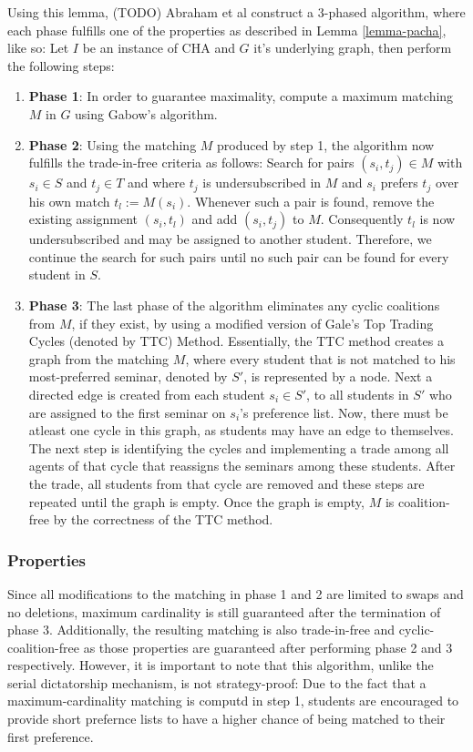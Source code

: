 Using this lemma, (TODO) Abraham et al \cite{Abraham:Pacha} construct a 3-phased algorithm, where each phase fulfills one of the properties as described in Lemma \ref{lemma-pacha}, like so: Let $I$ be an instance of CHA and $G$ it's underlying graph, then perform the following steps:
\begin{enumerate}
    \item \textbf{Phase 1}: In order to guarantee maximality, compute a maximum matching $M$ in $G$ using Gabow's algorithm. \cite{Gabow1983}
    \item \textbf{Phase 2}: Using the matching $M$ produced by step 1, the algorithm now fulfills the trade-in-free criteria as follows: Search for pairs $(s_i, t_j) \in M$ with $s_i \in S$ and $t_j \in T$ and where $t_j$ is undersubscribed in $M$ and $s_i$ prefers $t_j$ over his own match $t_l := M(s_i)$. Whenever such a pair is found, remove the existing assignment $(s_i, t_l)$ and add $(s_i, t_j)$ to $M$. Consequently $t_l$ is now undersubscribed and may be assigned to another student. Therefore, we continue the search for such pairs until no such pair can be found for every student in $S$.
    \item \textbf{Phase 3}: The last phase of the algorithm eliminates any cyclic coalitions from $M$, if they exist, by using a modified version of Gale's Top Trading Cycles (denoted by TTC) Method.\cite{ShapleyTTC} Essentially, the TTC method creates a graph from the matching $M$, where every student that is not matched to his most-preferred seminar, denoted by $S'$, is represented by a node. Next a directed edge is created from each student $s_i \in S'$, to all students in $S'$ who are assigned to the first seminar on $s_i$'s preference list. Now, there must be atleast one cycle in this graph, as students may have an edge to themselves. The next step is identifying the cycles and implementing a trade among all agents of that cycle that reassigns the seminars among these students. After the trade, all students from that cycle are removed and these steps are repeated until the graph is empty. Once the graph is empty, $M$ is coalition-free by the correctness of the TTC method.\cite{Abraham:Pacha}
\end{enumerate}

\subsubsection{Properties}
Since all modifications to the matching in phase 1 and 2 are limited to swaps and no deletions, maximum cardinality is still guaranteed after the termination of phase 3. Additionally, the resulting matching is also trade-in-free and cyclic-coalition-free as those properties are guaranteed after performing phase 2 and 3 respectively. However, it is important to note that this algorithm, unlike the serial dictatorship mechanism, is not strategy-proof: Due to the fact that a maximum-cardinality matching is computd in step 1, students are encouraged to provide short prefernce lists to have a higher chance of being matched to their first preference. 

